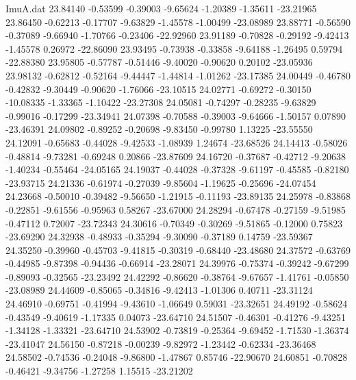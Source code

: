 \begin{filecontents}{ImuA.dat}
  23.84140   -0.53599   -0.39003   -9.65624   -1.20389   -1.35611  -23.21965
  23.86450   -0.62213   -0.17707   -9.63829   -1.45578   -1.00499  -23.08989
  23.88771   -0.56590   -0.37089   -9.66940   -1.70766   -0.23406  -22.92960
  23.91189   -0.70828   -0.29192   -9.42413   -1.45578    0.26972  -22.86090
  23.93495   -0.73938   -0.33858   -9.64188   -1.26495    0.59794  -22.88380
  23.95805   -0.57787   -0.51446   -9.40020   -0.90620    0.20102  -23.05936
  23.98132   -0.62812   -0.52164   -9.44447   -1.44814   -1.01262  -23.17385
  24.00449   -0.46780   -0.42832   -9.30449   -0.90620   -1.76066  -23.10515
  24.02771   -0.69272   -0.30150  -10.08335   -1.33365   -1.10422  -23.27308
  24.05081   -0.74297   -0.28235   -9.63829   -0.99016   -0.17299  -23.34941
  24.07398   -0.70588   -0.39003   -9.64666   -1.50157    0.07890  -23.46391
  24.09802   -0.89252   -0.20698   -9.83450   -0.99780    1.13225  -23.55550
  24.12091   -0.65683   -0.44028   -9.42533   -1.08939    1.24674  -23.68526
  24.14413   -0.58026   -0.48814   -9.73281   -0.69248    0.20866  -23.87609
  24.16720   -0.37687   -0.42712   -9.20638   -1.40234   -0.55464  -24.05165
  24.19037   -0.44028   -0.37328   -9.61197   -0.45585   -0.82180  -23.93715
  24.21336   -0.61974   -0.27039   -9.85604   -1.19625   -0.25696  -24.07454
  24.23668   -0.50010   -0.39482   -9.56650   -1.21915   -0.11193  -23.89135
  24.25978   -0.83868   -0.22851   -9.61556   -0.95963    0.58267  -23.67000
  24.28294   -0.67478   -0.27159   -9.51985   -0.47112    0.72007  -23.72343
  24.30616   -0.70349   -0.30269   -9.51865   -0.12000    0.75823  -23.69290
  24.32938   -0.48933   -0.35294   -9.30090   -0.37189    0.14759  -23.59367
  24.35250   -0.39960   -0.45703   -9.41815   -0.30319   -0.68440  -23.48680
  24.37572   -0.63769   -0.44985   -9.87398   -0.94436   -0.66914  -23.28071
  24.39976   -0.75374   -0.39242   -9.67299   -0.89093   -0.32565  -23.23492
  24.42292   -0.86620   -0.38764   -9.67657   -1.41761   -0.05850  -23.08989
  24.44609   -0.85065   -0.34816   -9.42413   -1.01306    0.40711  -23.31124
  24.46910   -0.69751   -0.41994   -9.43610   -1.06649    0.59031  -23.32651
  24.49192   -0.58624   -0.43549   -9.40619   -1.17335    0.04073  -23.64710
  24.51507   -0.46301   -0.41276   -9.43251   -1.34128   -1.33321  -23.64710
  24.53902   -0.73819   -0.25364   -9.69452   -1.71530   -1.36374  -23.41047
  24.56150   -0.87218   -0.00239   -9.82972   -1.23442   -0.62334  -23.36468
  24.58502   -0.74536   -0.24048   -9.86800   -1.47867    0.85746  -22.90670
  24.60851   -0.70828   -0.46421   -9.34756   -1.27258    1.15515  -23.21202

\end{filecontents}
